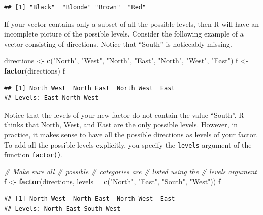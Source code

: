 \documentclass[
]{book}
\newenvironment{Shaded}{\begin{snugshade}}{\end{snugshade}}
\newcommand{\CommentTok}[1]{\textcolor[rgb]{0.56,0.35,0.01}{\textit{#1}}}
\newcommand{\DataTypeTok}[1]{\textcolor[rgb]{0.13,0.29,0.53}{#1}}
\newcommand{\KeywordTok}[1]{\textcolor[rgb]{0.13,0.29,0.53}{\textbf{#1}}}
\newcommand{\NormalTok}[1]{#1}
\newcommand{\StringTok}[1]{\textcolor[rgb]{0.31,0.60,0.02}{#1}}
\begin{document}
\begin{verbatim}
## [1] "Black"  "Blonde" "Brown"  "Red"
\end{verbatim}

If your vector contains only a subset of all the possible levels, then R will have an incomplete picture of the possible levels. Consider the following example of a vector consisting of directions. Notice that ``South'' is noticeably missing.

\begin{Shaded}
\begin{Highlighting}[]
\NormalTok{directions <-}\StringTok{ }\KeywordTok{c}\NormalTok{(}\StringTok{"North"}\NormalTok{,}
    \StringTok{"West"}\NormalTok{, }\StringTok{"North"}\NormalTok{,}
    \StringTok{"East"}\NormalTok{, }\StringTok{"North"}\NormalTok{,}
    \StringTok{"West"}\NormalTok{, }\StringTok{"East"}\NormalTok{)}
\NormalTok{f <-}\StringTok{ }\KeywordTok{factor}\NormalTok{(directions)}
\NormalTok{f}
\end{Highlighting}
\end{Shaded}

\begin{verbatim}
## [1] North West  North East  North West  East 
## Levels: East North West
\end{verbatim}

Notice that the levels of your new factor do not contain the value ``South''. R thinks that North, West, and East are the only possible levels. However, in practice, it makes sense to have all the possible directions as levels of your factor. To add all the possible levels explicitly, you specify the \texttt{levels} argument of the function \texttt{factor()}.

\begin{Shaded}
\begin{Highlighting}[]
\CommentTok{# Make sure all}
\CommentTok{# possible}
\CommentTok{# categories are}
\CommentTok{# listed using the}
\CommentTok{# levels argument}
\NormalTok{f <-}\StringTok{ }\KeywordTok{factor}\NormalTok{(directions,}
    \DataTypeTok{levels =} \KeywordTok{c}\NormalTok{(}\StringTok{"North"}\NormalTok{,}
        \StringTok{"East"}\NormalTok{, }\StringTok{"South"}\NormalTok{,}
        \StringTok{"West"}\NormalTok{))}
\NormalTok{f}
\end{Highlighting}
\end{Shaded}

\begin{verbatim}
## [1] North West  North East  North West  East 
## Levels: North East South West
\end{verbatim}
\end{document}
